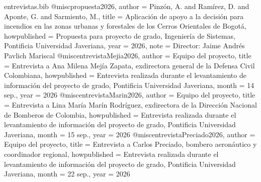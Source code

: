 %

\begin{filecontents*}[overwrite]{entrevistas.bib}
@misc{propuesta2026,
  author       = {Pinz{\'o}n, A. and Ram{\'i}rez, D. and Aponte, G. and Sarmiento, M.},
  title        = {Aplicación de apoyo a la decisión para incendios en las zonas urbanas y forestales de los {C}erros {O}rientales de {B}ogotá},
  howpublished = {Propuesta para proyecto de grado, Ingeniería de Sistemas, Pontificia Universidad Javeriana},
  year         = {2026},
  note         = {Director: Jaime Andrés Pavlich Mariscal}
}
@misc{entrevistaMejia2026,
  author       = {{Equipo del proyecto}},
  title        = {Entrevista a {A}na {M}ilena {M}ejía {Z}apata, exdirectora general de la {D}efensa {C}ivil {C}olombiana},
  howpublished = {Entrevista realizada durante el levantamiento de información del proyecto de grado, Pontificia Universidad Javeriana},
  month        = {14 sep.},
  year         = {2026}
}
@misc{entrevistaMarin2026,
  author       = {{Equipo del proyecto}},
  title        = {Entrevista a {L}ina {M}aría {M}arín {R}odríguez, exdirectora de la {D}irección {N}acional de {B}omberos de {C}olombia},
  howpublished = {Entrevista realizada durante el levantamiento de información del proyecto de grado, Pontificia Universidad Javeriana},
  month        = {15 sep.},
  year         = {2026}
}
@misc{entrevistaPreciado2026,
  author       = {{Equipo del proyecto}},
  title        = {Entrevista a {C}arlos {P}reciado, bombero aeronáutico y coordinador regional},
  howpublished = {Entrevista realizada durante el levantamiento de información del proyecto de grado, Pontificia Universidad Javeriana},
  month        = {22 sep.},
  year         = {2026}
}
\end{filecontents*}

